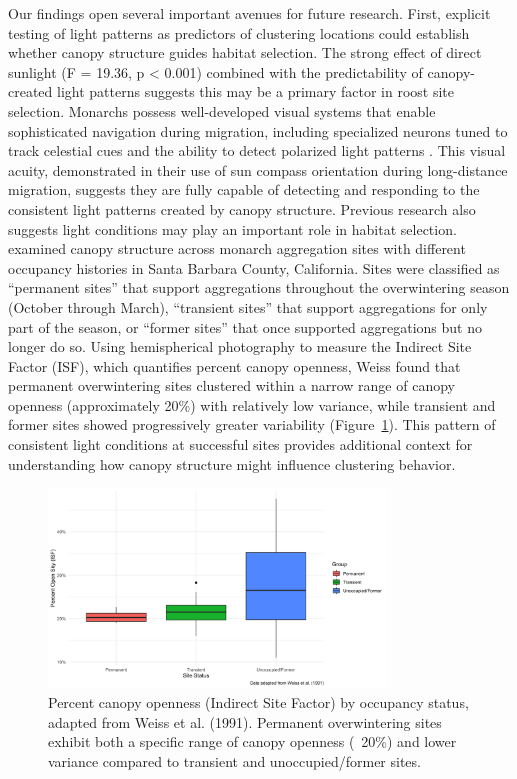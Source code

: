 Our findings open several important avenues for future research. First, explicit testing of light patterns as predictors of clustering locations could establish whether canopy structure guides habitat selection. The strong effect of direct sunlight (F = 19.36, p < 0.001) combined with the predictability of canopy-created light patterns suggests this may be a primary factor in roost site selection. Monarchs possess well-developed visual systems that enable sophisticated navigation during migration, including specialized neurons tuned to track celestial cues and the ability to detect polarized light patterns \autocite{nguyenSunCompassNeurons2021,mouritsenVirtualMigrationTethered2002}. This visual acuity, demonstrated in their use of sun compass orientation during long-distance migration, suggests they are fully capable of detecting and responding to the consistent light patterns created by canopy structure. Previous research also suggests light conditions may play an important role in habitat selection. \autocite{weissForestCanopyStructure1991} examined canopy structure across monarch aggregation sites with different occupancy histories in Santa Barbara County, California. Sites were classified as ``permanent sites'' that support aggregations throughout the overwintering season (October through March), ``transient sites'' that support aggregations for only part of the season, or ``former sites'' that once supported aggregations but no longer do so. Using hemispherical photography to measure the Indirect Site Factor (ISF), which quantifies percent canopy openness, Weiss found that permanent overwintering sites clustered within a narrow range of canopy openness (approximately 20\%) with relatively low variance, while transient and former sites showed progressively greater variability (Figure~\ref{fig:weiss_canopy}). This pattern of consistent light conditions at successful sites provides additional context for understanding how canopy structure might influence clustering behavior.

\begin{figure}[h]
    \centering
    \includegraphics[width=0.8\textwidth]{figures/discussion/weiss_adapted_boxplot.png}
    \caption{Percent canopy openness (Indirect Site Factor) by occupancy status, adapted from Weiss et al. (1991). Permanent overwintering sites exhibit both a specific range of canopy openness (~20\%) and lower variance compared to transient and unoccupied/former sites.}
    \label{fig:weiss_canopy}
\end{figure}

